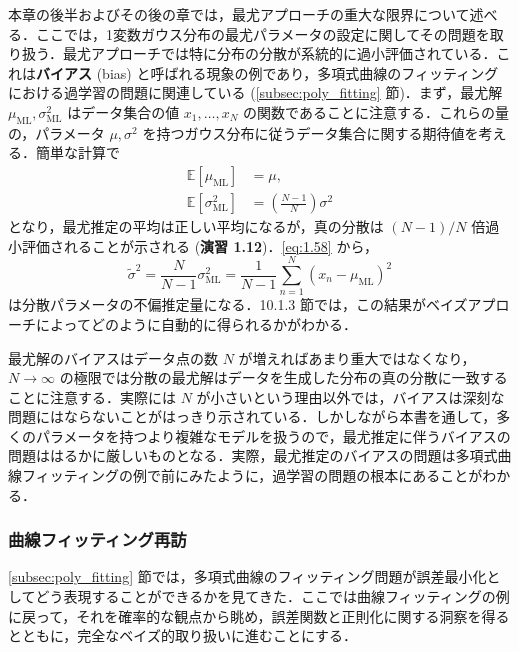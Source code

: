 \documentclass[uplatex,a4paper,oneside,openany,dvipdfmx]{jsarticle}
\numberwithin{equation}{section}
\theoremstyle{mystyle} %
\newcommand{\BE}{\mathbb{E}}
\newcommand{\tb}[1]{\textbf{#1}}
\begin{document}
本章の後半およびその後の章では，最尤アプローチの重大な限界について述べる．ここでは，1変数ガウス分布の最尤パラメータの設定に関してその問題を取り扱う．最尤アプローチでは特に分布の分散が系統的に過小評価されている．これは\tb{バイアス} (bias) と呼ばれる現象の例であり，多項式曲線のフィッティングにおける過学習の問題に関連している (\ref{subsec:poly_fitting} 節)．まず，最尤解 $\mu_{\text{ML}},\sigma_{\text{ML}}^{2}$ はデータ集合の値 $x_{1},\ldots,x_{N}$ の関数であることに注意する．これらの量の，パラメータ $\mu,\sigma^{2}$ を持つガウス分布に従うデータ集合に関する期待値を考える．簡単な計算で
\begin{align}
    \BE[\mu_{\text{ML}}] &= \mu, \label{eq:1.57}\\
    \BE[\sigma_{\text{ML}}^{2}] &= \left(\frac{N-1}{N}\right) \sigma^{2} \label{eq:1.58}
\end{align}
となり，最尤推定の平均は正しい平均になるが，真の分散は $(N-1)/N$ 倍過小評価されることが示される (\tb{演習 1.12})．\eqref{eq:1.58} から，
\begin{equation} \label{eq:1.59}
    \widetilde{\sigma}^{2} = \frac{N}{N-1} \sigma_{\text{ML}}^{2} = \frac{1}{N-1} \sum_{n=1}^{N} (x_{n}-\mu_{\text{ML}})^{2}
\end{equation}
は分散パラメータの不偏推定量になる．10.1.3 節では，この結果がベイズアプローチによってどのように自動的に得られるかがわかる．

最尤解のバイアスはデータ点の数 $N$ が増えればあまり重大ではなくなり，$N \rightarrow \infty$ の極限では分散の最尤解はデータを生成した分布の真の分散に一致することに注意する．実際には $N$ が小さいという理由以外では，バイアスは深刻な問題にはならないことがはっきり示されている．しかしながら本書を通して，多くのパラメータを持つより複雑なモデルを扱うので，最尤推定に伴うバイアスの問題ははるかに厳しいものとなる．実際，最尤推定のバイアスの問題は多項式曲線フィッティングの例で前にみたように，過学習の問題の根本にあることがわかる．

\subsubsection{曲線フィッティング再訪} \label{subsubsec:revisitting_curve_fitting}

\ref{subsec:poly_fitting} 節では，多項式曲線のフィッティング問題が誤差最小化としてどう表現することができるかを見てきた．ここでは曲線フィッティングの例に戻って，それを確率的な観点から眺め，誤差関数と正則化に関する洞察を得るとともに，完全なベイズ的取り扱いに進むことにする．
\end{document}
